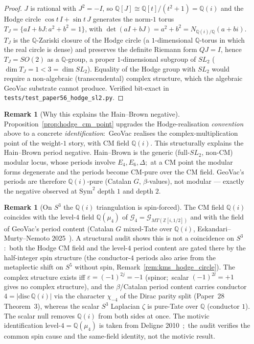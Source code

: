 \documentclass[11pt,a4paper]{article}
\theoremstyle{plain}
\theoremstyle{definition}
\newtheorem{remark}[theorem]{Remark}
\newcommand{\Sym}{\mathrm{Sym}}
\newcommand{\Q}{\mathbb{Q}}
\newcommand{\Z}{\mathbb{Z}}
\begin{document}
\begin{proof}
$J$ is rational with $J^2 = -I$, so $\Q[J] \cong \Q[t]/(t^2 + 1) = \Q(i)$
and the Hodge circle $\cos t\, I + \sin t\, J$ generates the norm-$1$
torus $T_J = \{aI + bJ : a^2 + b^2 = 1\}$, with $\det(aI + bJ) = a^2 + b^2
= N_{\Q(i)/\Q}(a + bi)$.  $T_J$ is the $\Q$-Zariski closure of the Hodge
circle (a $1$-dimensional $\Q$-torus in which the real circle is dense)
and preserves the definite Riemann form $QJ = I$, hence $T_J = SO(2)$ as
a $\Q$-group, a proper $1$-dimensional subgroup of $SL_2$ ($\dim T_J = 1
< 3 = \dim SL_2$).  Equality of the Hodge group with $SL_2$ would require a
non-algebraic (transcendental) complex structure, which the algebraic
GeoVac substrate cannot produce.  Verified bit-exact in
\texttt{tests/test\_paper56\_hodge\_sl2.py}.
\end{proof}

\begin{remark}[Why this explains the Hain--Brown negative]
\label{rem:cm_explains_hb}
Proposition~\ref{prop:hodge_cm_point} upgrades the Hodge-realisation
\emph{convention} above to a concrete \emph{identification}:\ GeoVac
realises the complex-multiplication point of the weight-$1$ story, with
CM field $\Q(i)$.  This structurally explains the Hain--Brown period
negative.  Hain--Brown is the generic (full-$SL_2$, non-CM) modular
locus, whose periods involve $E_4, E_6, \Delta$;\ at a CM point the
modular forms degenerate and the periods become CM-pure over the CM
field.  GeoVac's periods are therefore $\Q(i)$-pure (Catalan $G$,
$\beta$-values), not modular --- exactly the negative observed at
$\Sym^2$ depth $1$ and depth $2$.
\end{remark}

\begin{remark}[On $S^3$ the $\Q(i)$ triangulation is spin-forced]
\label{rem:qi_triangulation}
The CM field $\Q(i)$ coincides with the level-$4$ field $\Q(\mu_4)$ of
$\mathcal{G}_4 = \mathcal{G}_{MT(\Z[i, 1/2])}$ and with the field of
GeoVac's period content (Catalan $G$ mixed-Tate over $\Q(i)$,
Eskandari--Murty--Nemoto 2025~\cite{eskandari_murty_nemoto2025}).  A
structural audit shows
this is not a coincidence on $S^3$:\ both the Hodge CM field and the
level-$4$ period content are gated there by the half-integer spin
structure (the conductor-$4$ periods also arise from the metaplectic
shift on $S^5$ without spin, Remark~\ref{rem:kms_hodge_circle}).  The complex
structure exists iff $\varepsilon = (-1)^{2j} = -1$ (spinor;\ scalar
$(-1)^{2l} = +1$ gives no complex structure), and the $\beta$/Catalan
period content carries conductor $4 = |\mathrm{disc}\,\Q(i)|$ via the
character $\chi_{-4}$ of the Dirac parity split (Paper~28~\cite{loutey_paper28}
Theorem~3),
whereas the scalar $S^3$ Laplacian $\zeta$ is pure-Tate over $\Q$
(conductor $1$).  The scalar null removes $\Q(i)$ from both sides at
once.  The motivic identification level-$4 = \Q(\mu_4)$ is taken from
Deligne 2010~\cite{deligne2010};\ the audit verifies the common spin
cause and the same-field identity, not the motivic result.
\end{remark}
\end{document}
